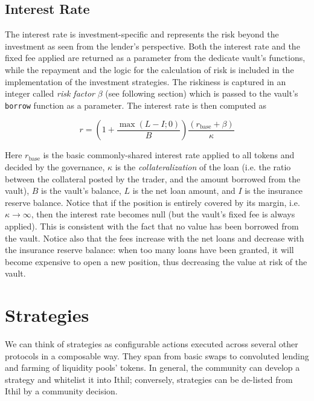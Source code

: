 \documentclass[a4paper,10 pt]{article}
\theoremstyle{definition}
\begin{document}
\subsection{Interest Rate}

The interest rate is investment-specific and represents the risk beyond the investment as seen from the lender's perspective.
Both the interest rate and the fixed fee applied are returned as a parameter from the dedicate vault’s functions, while the repayment and the logic for the calculation of risk is included in the implementation of the investment strategies. The riskiness is captured in an integer called {\it risk factor} $\beta$ (see following section) which is passed to the vault's \verb|borrow| function as a parameter. The interest rate is then computed as

\begin{equation}\label{interestrate}r =  \left(1+\frac{\max{(L-I;0)}}{B}\right)\frac{(r_{\text{base}} + \beta)}{\kappa}\end{equation}

Here $r_{\text{base}}$ is the basic commonly-shared interest rate applied to all tokens and decided by the governance, $\kappa$ is the {\it collateralization} of the loan (i.e. the ratio between the collateral posted by the trader, and the amount borrowed from the vault), $B$ is the vault's balance, $L$ is the net loan amount, and $I$ is the insurance reserve balance. Notice that if the position is entirely covered by its margin, i.e. $\kappa \rightarrow \infty$, then the interest rate becomes null (but the vault's fixed fee is always applied). This is consistent with the fact that no value has been borrowed from the vault. Notice also that the fees increase with the net loans and decrease with the insurance reserve balance: when too many loans have been granted, it will become expensive to open a new position, thus decreasing the value at risk of the vault.

\section{Strategies}
We can think of strategies as configurable actions executed across several other protocols in a composable way. They span from basic swaps to convoluted lending and farming of liquidity pools' tokens. In general, the community can develop a strategy and whitelist it into Ithil; conversely, strategies can be de-listed from Ithil by a community decision.
\end{document}
